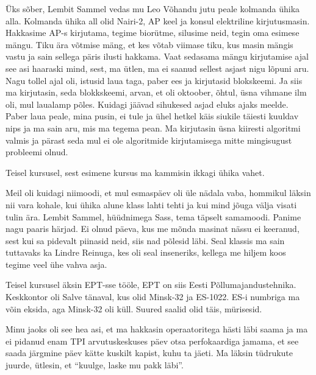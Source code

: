 Üks sõber, Lembit Sammel vedas mu Leo Võhandu jutu peale kolmanda ühika alla. Kolmanda ühika all olid Nairi-2, AP keel ja konsul elektriline kirjutusmasin. Hakkasime AP-s kirjutama, tegime biorütme, silusime neid, tegin oma esimese mängu. Tiku ära võtmise mäng, et kes võtab viimase tiku, kus masin mängis vastu ja sain sellega päris ilusti hakkama. Vaat sedasama mängu kirjutamise ajal see asi haaraski mind, sest, ma ütlen,  ma ei saanud sellest asjast nigu lõpuni aru.  Nagu tollel ajal oli, istusid laua taga, paber ees ja kirjutasid blokskeemi. Ja siis ma kirjutasin, seda blokkskeemi, arvan, et oli oktoober, õhtul, üsna vihmane ilm oli, mul laualamp põles.  Kuidagi jäävad sihukesed asjad eluks ajaks meelde. Paber laua peale, mina pusin, ei tule ja ühel hetkel käis siukile täiesti kuuldav nips ja ma sain aru, mis ma tegema pean. Ma kirjutasin üsna kiiresti  algoritmi valmis ja pärast seda mul ei ole algoritmide kirjutamisega mitte mingisugust probleemi olnud. 

Teisel kursusel, sest esimene kursus ma kammisin ikkagi ühika vahet. 

Meil oli kuidagi niimoodi, et mul esmaspäev oli üle nädala vaba, hommikul läksin nii vara kohale, kui ühika alune klass lahti tehti ja kui mind jõuga välja visati tulin ära. Lembit Sammel, hüüdnimega Sass, tema täpselt samamoodi. Panime nagu paaris härjad. Ei olnud päeva, kus me mõnda masinat nässu ei keeranud, sest kui sa pidevalt piinasid neid, siis nad põlesid läbi. Seal klassis ma sain tuttavaks ka Lindre Reinuga, kes oli seal inseneriks,  kellega me hiljem koos tegime veel ühe vahva asja. 

Teisel kursusel äksin EPT-sse tööle, EPT on siis Eesti Põllumajandustehnika. Keskkontor oli Salve tänaval, kus olid Minsk-32 ja ES-1022. ES-i numbriga ma võin eksida, aga Minsk-32 oli küll. Suured saalid olid täis, mürisesid. 

Minu jaoks oli see hea asi, et ma hakkasin operaatoritega hästi läbi saama ja ma ei pidanud enam TPI arvutuskeskuses päev otsa perfokaardiga jamama, et see saada järgmine päev kätte kuskilt kapist, kuhu ta jäeti. Ma läksin tüdrukute juurde, ütlesin, et \enquote{kuulge,  laske mu pakk läbi}. 

